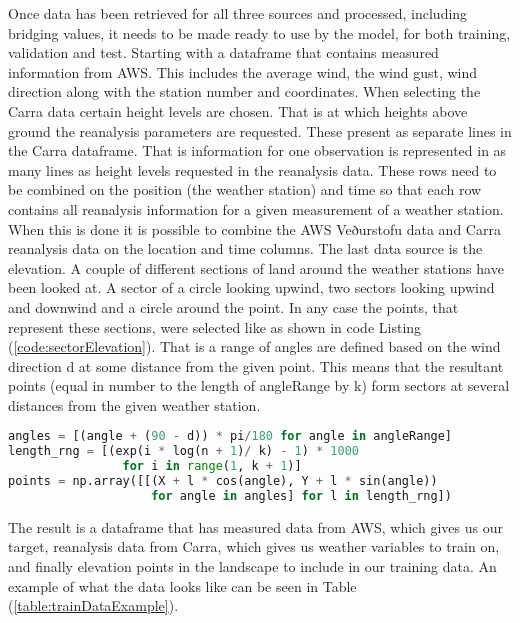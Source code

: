 Once data has been retrieved for all three sources and processed, including bridging values, it needs to be made ready to use by the model, for both training, validation and test. Starting with a dataframe that contains measured information from AWS. This includes the average wind, the wind gust, wind direction along with the station number and coordinates. When selecting the Carra data certain height levels are chosen. That is at which heights above ground the reanalysis parameters are requested. These present as separate lines in the Carra dataframe. That is information for one observation is represented in as many lines as height levels requested in the reanalysis data. These rows need to be combined on the position (the weather station) and time so that each row contains all reanalysis information for a given measurement of a weather station. When this is done it is possible to combine the AWS Veðurstofu data and Carra reanalysis data on the location and time columns. The last data source is the elevation. A couple of different sections of land around the weather stations have been looked at. A sector of a circle looking upwind, two sectors looking upwind and downwind and a circle around the point. In any case the points, that represent these sections, were selected like as shown in code Listing (\ref{code:sectorElevation}). That is a range of angles are defined based on the wind direction d at some distance from the given point. This means that the resultant points (equal in number to the length of angleRange by k) form sectors at several distances from the given weather station.

\begin{lstlisting}[language = Python, caption = {Sector elevation points generated}, label = code:sectorElevation]
angles = [(angle + (90 - d)) * pi/180 for angle in angleRange]
length_rng = [(exp(i * log(n + 1)/ k) - 1) * 1000 
                for i in range(1, k + 1)]
points = np.array([[(X + l * cos(angle), Y + l * sin(angle))
                    for angle in angles] for l in length_rng])   
\end{lstlisting}

The result is a dataframe that has measured data from AWS, which gives us our target, reanalysis data from Carra, which gives us weather variables to train on, and finally elevation points in the landscape to include in our training data. An example of what the data looks like can be seen in Table (\ref{table:trainDataExample}).

\begin{table}[h]
    \caption{An example of data structure used with model}
    \label{table:trainDataExample}
\end{table}

